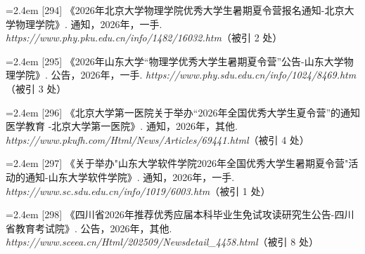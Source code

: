 {\vspace{0.6pt}
\vspace{3.5pt}\par
\nopagebreak\vspace{1pt}
\noindent\hangindent=2.4em \label{src:S0384}{\color{cAccent}[294]} 《2026年北京大学物理学院优秀大学生暑期夏令营报名通知-北京大学物理学院》. 通知，2026年，一手. \textit{https://www.phy.pku.edu.cn/info/1482/16032.htm}（被引 2 处）\par
\vspace{0.6pt}
\vspace{3.5pt}\par
\nopagebreak\vspace{1pt}
\noindent\hangindent=2.4em \label{src:S0385}{\color{cAccent}[295]} 《2026年山东大学“物理学优秀大学生暑期夏令营”公告-山东大学物理学院》. 公告，2026年，一手. \textit{https://www.phy.sdu.edu.cn/info/1024/8469.htm}（被引 3 处）\par
\vspace{0.6pt}
\vspace{3.5pt}\par
\nopagebreak\vspace{1pt}
\noindent\hangindent=2.4em \label{src:S0386}{\color{cAccent}[296]} 《北京大学第一医院关于举办“2026年全国优秀大学生夏令营”的通知 医学教育 -北京大学第一医院》. 通知，2026年，其他. \textit{https://www.pkufh.com/Html/News/Articles/69441.html}（被引 4 处）\par
\vspace{0.6pt}
\vspace{3.5pt}\par
\nopagebreak\vspace{1pt}
\noindent\hangindent=2.4em \label{src:S0387}{\color{cAccent}[297]} 《关于举办"山东大学软件学院2026年全国优秀大学生暑期夏令营"活动的通知-山东大学软件学院》. 通知，2026年，一手. \textit{https://www.sc.sdu.edu.cn/info/1019/6003.htm}（被引 1 处）\par
\vspace{0.6pt}
\vspace{3.5pt}\par
\nopagebreak\vspace{1pt}
\noindent\hangindent=2.4em \label{src:S0388}{\color{cAccent}[298]} 《四川省2026年推荐优秀应届本科毕业生免试攻读研究生公告-四川省教育考试院》. 公告，2026年，其他. \textit{https://www.sceea.cn/Html/202509/Newsdetail\_4458.html}（被引 8 处）\par
}
